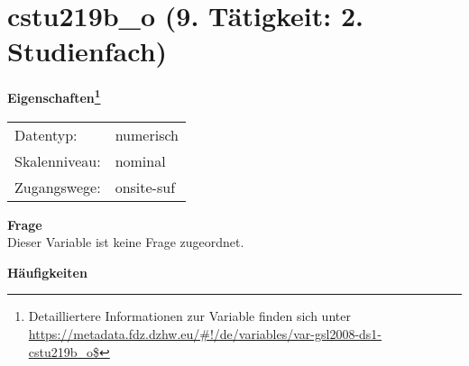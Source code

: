 
    \setcounter{footnote}{0}

    \vspace*{-1.8cm}
	\section{cstu219b\_o (9. Tätigkeit: 2. Studienfach)}
	\label{section:cstu219b_o}



    \vspace*{0.5cm}
    \noindent\textbf{Eigenschaften\footnote{Detailliertere Informationen zur Variable finden sich unter
		\url{https://metadata.fdz.dzhw.eu/\#!/de/variables/var-gsl2008-ds1-cstu219b_o$}}}\\
	\begin{tabularx}{\hsize}{@{}lX}
	Datentyp: & numerisch \\
	Skalenniveau: & nominal \\
	Zugangswege: &
	  onsite-suf
 \\
    \end{tabularx}



		\vspace*{0.5cm}
		\noindent\textbf{Frage}\\
		Dieser Variable ist keine Frage zugeordnet.





        		\vspace*{0.5cm}
                \noindent\textbf{Häufigkeiten}

